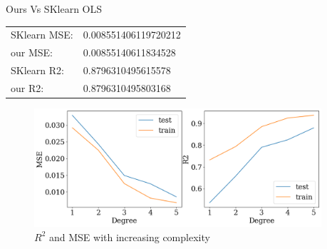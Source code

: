 \documentclass[twoside,11pt]{report}
\begin{document}
\begin{mytable}[float=h,label=tab:sklearnvsOurs, width=.5\textwidth]{Ours Vs SKlearn OLS}
\centering
\begin{tabular}{l l}
    SKlearn MSE: & 0.008551406119720212\\
    our MSE: & 0.00855140611834528\\
    SKlearn R2:&  0.8796310495615578\\
    our R2:&  0.8796310495803168
\end{tabular}%
\end{mytable}

\begin{figure}[!h]
    \begin{center}
        \includegraphics[width=0.95\textwidth]{../runsAndAdditions/R2andMSEOLS.png}
    \end{center}
    \caption{$R^2$ and MSE with increasing complexity}\label{fig:R2andMSEOLS}
\end{figure}
\end{document}
